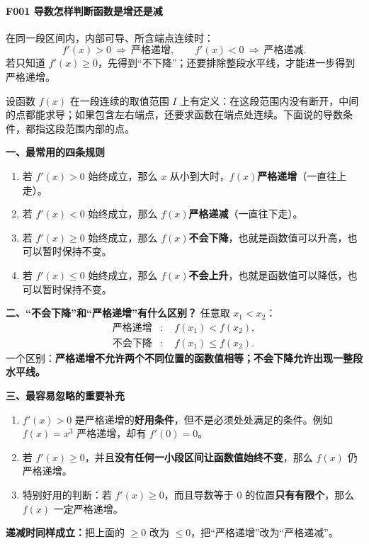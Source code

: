 \begin{statementbox}
\paragraph{F001 导数怎样判断函数是增还是减}
\begin{center}\end{center}
在同一段区间内，内部可导、所含端点连续时：
\[
 f'(x)>0\ \Longrightarrow\ \text{严格递增},\qquad
 f'(x)<0\ \Longrightarrow\ \text{严格递减}.
\]
若只知道 $f'(x)\ge0$，先得到“不下降”；还要排除整段水平线，才能进一步得到严格递增。

\end{statementbox}
\clearpage
\begin{statementbox}

设函数 $f(x)$ 在一段连续的取值范围 $I$ 上有定义：在这段范围内没有断开，中间的点都能求导；如果包含左右端点，还要求函数在端点处连续。下面说的导数条件，都指这段范围内部的点。

\textbf{一、最常用的四条规则}
\begin{enumerate}
  \item 若 $f'(x)>0$ 始终成立，那么 $x$ 从小到大时，$f(x)$\textbf{严格递增}（一直往上走）。
  \item 若 $f'(x)<0$ 始终成立，那么 $f(x)$\textbf{严格递减}（一直往下走）。
  \item 若 $f'(x)\ge 0$ 始终成立，那么 $f(x)$\textbf{不会下降}，也就是函数值可以升高，也可以暂时保持不变。
  \item 若 $f'(x)\le 0$ 始终成立，那么 $f(x)$\textbf{不会上升}，也就是函数值可以降低，也可以暂时保持不变。
\end{enumerate}

\textbf{二、``不会下降''和``严格递增''有什么区别？}
任意取 $x_1<x_2$：
\[
\begin{aligned}
\text{严格递增}&:\quad f(x_1)<f(x_2),\\
\text{不会下降}&:\quad f(x_1)\le f(x_2).
\end{aligned}
\]
一个区别：\textbf{严格递增不允许两个不同位置的函数值相等；不会下降允许出现一整段水平线。}

\textbf{三、最容易忽略的重要补充}
\begin{enumerate}
  \item $f'(x)>0$ 是严格递增的\textbf{好用条件}，但不是必须处处满足的条件。例如 $f(x)=x^3$ 严格递增，却有 $f'(0)=0$。
  \item 若 $f'(x)\ge0$，并且\textbf{没有任何一小段区间让函数值始终不变}，那么 $f(x)$ 仍严格递增。
  \item 特别好用的判断：若 $f'(x)\ge0$，而且导数等于 $0$ 的位置\textbf{只有有限个}，那么 $f(x)$ 一定严格递增。
\end{enumerate}
\textbf{递减时同样成立：}把上面的 $\ge0$ 改为 $\le0$，把``严格递增''改为``严格递减''。
\end{statementbox}
